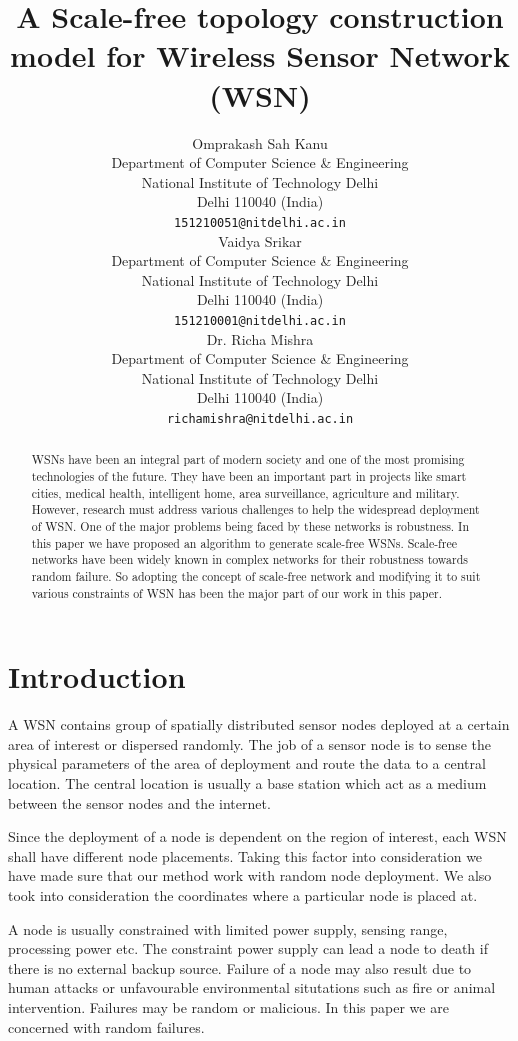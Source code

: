 \documentclass{article}
\title{A Scale-free topology construction model for Wireless Sensor Network (WSN)}
\author{
  Omprakash Sah Kanu \\
  Department of Computer Science \& Engineering\\
  National Institute of Technology Delhi \\
  Delhi 110040 (India)\\
  \texttt{151210051@nitdelhi.ac.in} \\
   \And
 Vaidya Srikar \\
  Department of Computer Science \& Engineering\\
  National Institute of Technology Delhi \\
  Delhi 110040 (India)\\
  \texttt{151210001@nitdelhi.ac.in} \\
  \And
   Dr. Richa Mishra\\
    Department of Computer Science \& Engineering\\
  National Institute of Technology Delhi \\
  Delhi 110040 (India)\\
  \texttt{richamishra@nitdelhi.ac.in} \\
}
\begin{document}
\maketitle

\begin{abstract}
WSNs have been an integral part of modern society and one of the most promising technologies of the future. They have been an important part in projects like smart cities, medical health, intelligent home, area surveillance, agriculture and military. However, research must address various challenges to help the widespread deployment of WSN. One of the major problems being faced by these networks is robustness. In this paper we have proposed an algorithm to generate scale-free WSNs. Scale-free networks have been widely known in complex networks for their robustness towards random failure. So adopting the concept of scale-free network and modifying it to suit various constraints of WSN has been the major part of our work in this paper. 
\end{abstract}




\section{Introduction}
A WSN contains group of spatially distributed sensor nodes deployed at a certain area of interest or dispersed randomly. The job of a sensor node is to sense the physical parameters of the area of deployment and route the data to a central location. The central location is usually a base station which act as a medium between the sensor nodes and the internet. 

Since the deployment of a node is dependent on the region of interest, each WSN shall have different node placements. Taking this factor into consideration we have made sure that our method work with random node deployment. We also took into consideration the coordinates where a particular node is placed at.    

A node is usually constrained with limited power supply, sensing range, processing power etc. The constraint power supply can lead a node to death if there is no external backup source. Failure of a node may also result due to human attacks or unfavourable environmental situtations such as fire or animal intervention. Failures may be random or malicious. In this paper we are concerned with random failures.
\end{document}
